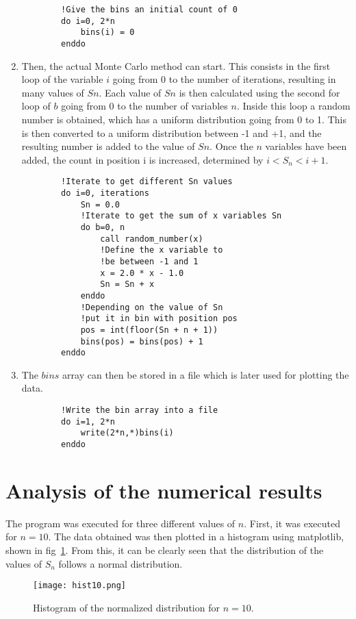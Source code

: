 \documentclass[12pt]{article}
\begin{document}
\begin{enumerate}
\begin{lstlisting}
		!Give the bins an initial count of 0
		do i=0, 2*n
			bins(i) = 0
		enddo
	\end{lstlisting}
	\item Then, the actual Monte Carlo method can start. This consists in the first loop of the variable $i$ going from 0 to the number of iterations, resulting in many values of $Sn$. Each value of $Sn$ is then calculated using the second for loop of $b$ going from 0 to the number of variables $n$. Inside this loop a random number is obtained, which has a uniform distribution going from 0 to 1. This is then converted to a uniform distribution between -1 and +1, and the resulting number is added to the value of $Sn$. Once the $n$ variables have been added, the count in position i is increased, determined by $i < S_{n} < i+1$. 
	\begin{lstlisting}
		!Iterate to get different Sn values
		do i=0, iterations
			Sn = 0.0
			!Iterate to get the sum of x variables Sn
			do b=0, n
				call random_number(x)
				!Define the x variable to 
				!be between -1 and 1
				x = 2.0 * x - 1.0
				Sn = Sn + x
			enddo
			!Depending on the value of Sn 
			!put it in bin with position pos
			pos = int(floor(Sn + n + 1))
			bins(pos) = bins(pos) + 1
		enddo
	\end{lstlisting}
	\item The $bins$ array can then be stored in a file which is later used for plotting the data. 
	\begin{lstlisting}
		!Write the bin array into a file
		do i=1, 2*n
			write(2*n,*)bins(i)
		enddo
	\end{lstlisting}
\end{enumerate}


\section*{Analysis of the numerical results}
The program was executed for three different values of $n$. First, it was executed for $n = 10$. The data obtained was then plotted in a histogram using matplotlib, shown in fig~\ref{ref:histo10}. From this, it can be clearly seen that the distribution of the values of $S_{n}$ follows a normal distribution.

\begin{figure}[H]
	\centering
	\texttt{[image: hist10.png]}
	\caption{Histogram of the normalized distribution for $n = 10$.}
	\label{ref:histo10}
\end{figure}
\end{document}
